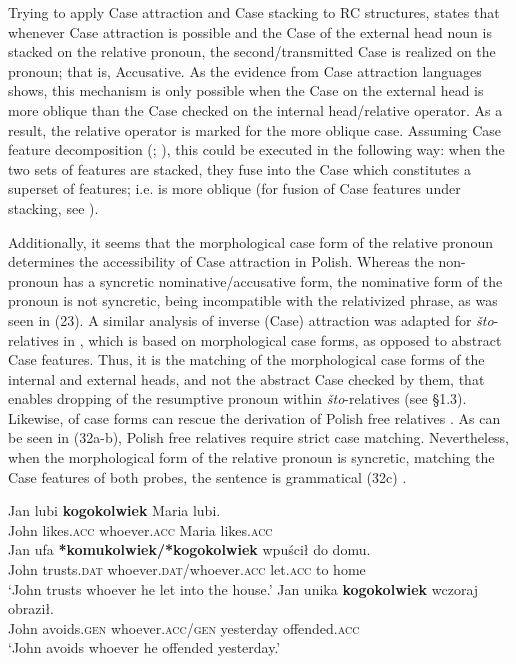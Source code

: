 \documentclass[output=paper]{langsci/langscibook}
\begin{document}
Trying to apply Case attraction and Case stacking to RC structures, \citet{Łęska2016} states that whenever Case attraction is possible and the Case of the external head noun is stacked on the relative pronoun, the second\slash transmitted Case is realized on the pronoun; that is, Accusative. As the evidence from Case attraction languages shows, this mechanism is only possible when the Case on the external head is more oblique than the Case checked on the internal head\slash relative operator. As a result, the relative operator is marked for the more oblique case. Assuming Case feature decomposition (\citealt{Assmann2013}; \citealt{Georgi2014}), this could be executed in the following way: when the two sets of features are stacked, they fuse into the Case which constitutes a superset of features; i.e. is more oblique (for fusion of Case features under stacking, see \citealt{Assmann2014Stacking}).

Additionally, it seems that the morphological case form of the relative pronoun determines the accessibility of Case attraction in Polish. Whereas the non- pronoun has a syncretic nominative\slash accusative form, the nominative form of the  pronoun is not syncretic, being incompatible with the relativized  phrase, as was seen in (23). A similar analysis of inverse (Case) attraction was adapted for  \textit{što}{}-relatives in \citet{Gračanin-Yuksek2013}, which is based on morphological case forms, as opposed to abstract Case features. Thus, it is the matching of the morphological case forms of the internal and external heads, and not the abstract Case checked by them, that enables dropping of the resumptive pronoun within \textit{što}{}-relatives (see §1.3). Likewise,  of case forms can rescue the derivation of Polish free relatives \citep{Assmann2014Matching}. As can be seen in (32a-b), Polish free relatives require strict case matching. Nevertheless, when the morphological form of the relative pronoun is syncretic, matching the Case features of both probes, the sentence is grammatical (32c) \citep[3]{Assmann2014Matching}. 

\ea%
    \label{ex:leska:32}
    \ea
    \gll Jan   lubi   \textbf{kogokolwiek}   Maria lubi.\\
         John   likes.\textsc{acc}     whoever.\textsc{acc}     Maria likes.\textsc{acc}\\
    \ex
    \gll Jan  ufa   \textbf{*komukolwiek}\textbf{/*kogokolwiek} wpuścił   do   domu.\\
         John   trusts.\textsc{dat}     whoever.\textsc{dat}/whoever.\textsc{acc}   let.\textsc{acc}     to   home\\
    \glt ‘John trusts whoever he let into the house.’
    \ex
    \gll Jan   unika   \textbf{kogokolwiek} wczoraj   obraził.\\
         John   avoids.\textsc{gen}   whoever.\textsc{acc/gen}       yesterday   offended.\textsc{acc}\\
    \glt ‘John avoids whoever he offended yesterday.’
    \z
\z    
\end{document}
